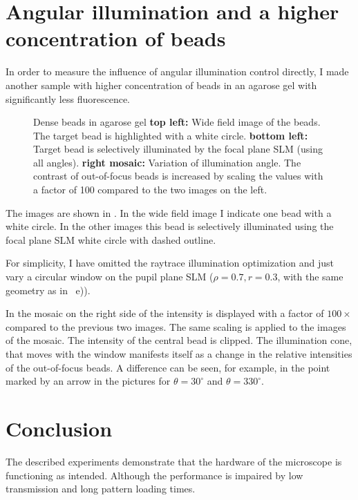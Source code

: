 \section{Angular illumination and a higher concentration of beads}
In order to measure the influence of angular illumination control
directly, I made another sample with higher concentration of beads in
an agarose gel with significantly less fluorescence.


\begin{figure}[!hbt]
  \centering
  \caption{Dense beads in agarose gel {\bf top left:} Wide field image
    of the beads. The target bead is highlighted with a white circle.
    {\bf bottom left:} Target bead is selectively illuminated by the
    focal plane SLM (using all angles).  {\bf right mosaic:} Variation
    of illumination angle. The contrast of out-of-focus beads is
    increased by scaling the values with a factor of 100 compared to
    the two images on the left.}
  \label{fig:montage-ang}
\end{figure}

The images are shown in . In the wide field
image I indicate one bead with a white circle. In the other images
this bead is selectively illuminated using the focal plane SLM white
circle with dashed outline.

For simplicity, I have omitted the raytrace illumination optimization
and just vary a circular window on the pupil plane SLM ($\rho=0.7,
r=0.3$, with the same geometry as in ~e)).


In the mosaic on the right side of  the
intensity is displayed with a factor of $100\times$ compared to the
previous two images. The same scaling is applied to the images of the
mosaic. The intensity of the central bead is clipped. The illumination
cone, that moves with the window manifests itself as a change in the
relative intensities of the out-of-focus beads. A difference can be
seen, for example, in the point marked by an arrow in the pictures for
$\theta=30^\circ$ and $\theta=330^\circ$.

\section{Conclusion}
The described experiments demonstrate that the hardware of the
microscope is functioning as intended. Although the performance is
impaired by low transmission and long pattern loading times.

